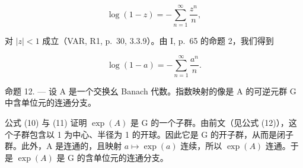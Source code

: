 \[
\log (1 - z) = - \sum_ {n = 1} ^ {\infty} \frac {z ^ {n}}{n},
\]

对 \(|z| < 1\) 成立（VAR, R1, p.~30, 3.3.9）。由 I, p.~65 的命题 2，我们得到

\[
\log (1 - a) = - \sum_ {n = 1} ^ {\infty} \frac {a ^ {n}}{n}.\tag{14}
\]

命题 12. --- 设 A 是一个交换幺 Banach 代数。指数映射的像是 A 的可逆元群 G 中含单位元的连通分支。

公式 (10) 与 (11) 证明 \(\exp(A)\) 是 G 的一个子群。由前文（见公式 (12)），这个子群包含以 1 为中心、半径为 1 的开球。因此它是 G 的开子群，从而是闭子群。此外，A 是连通的，且映射 \(a \mapsto \exp(a)\) 连续，所以 \(\exp(A)\) 连通。于是 \(\exp(A)\) 是 G 的含单位元的连通分支。

